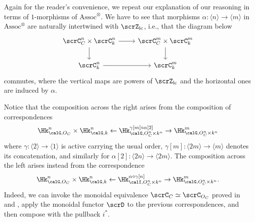 \documentclass[10pt, reqno]{amsart}
\theoremstyle{plain}
\theoremstyle{definition}
\numberwithin{equation}{section}
\begin{document}
	Again for the reader's convenience, we repeat our explanation of our reasoning in terms of $1$-morphisms of $\mathrm{Assoc}^\otimes$. We have to see that morphisms $\alpha\colon \langle n \rangle \to \langle m \rangle$ in $\mathrm{Assoc}^\otimes$ are naturally intertwined with $\scrZ_{\mathrm{lc}}$, i.e., that the diagram below
	\begin{equation}\begin{tikzcd}
			\scrC_C^n\times \scrC_k^n& \scrC_C^m\times \scrC_k^m\\
			\scrC_k^n & \scrC_k^m
			\arrow[from=1-2, to=2-2]
			\arrow[from=1-1, to=2-1]
			\arrow[from=1-1, to=1-2]
			\arrow[from=2-1, to=2-2]
		\end{tikzcd}
	\end{equation} commutes, where the vertical maps are powers of $\scrZ_{\mathrm{lc}}$ and the horizontal ones are induced by $\alpha$.
	
	Notice that the composition across the right arises from the composition of correspondences
	\begin{equation}
		\Hk_{\calG,O_C}^n \times \Hk_{\calG,k}^n \leftarrow \Hk_{\calG,O_C^n \times k^n}^{\gamma[m]\circ\alpha[2]} \to \Hk_{\calG,O_C^n\times k^n}^m
	\end{equation}
	where $\gamma: \langle 2 \rangle \to \langle 1 \rangle$ is active carrying the usual order, $\gamma[m]\colon \langle 2m \rangle \to \langle m \rangle$ denotes its concatenation, and similarly for $\alpha[2]\colon \langle 2n \rangle \to \langle 2m \rangle$. The composition across the left arises instead from the correspondence
	\begin{equation}
		\Hk_{\calG,O_C}^n \times \Hk_{\calG,k}^n
		\leftarrow \Hk_{\calI, O_C^n \times k^n}^{\alpha\circ \gamma[n]} \to \Hk_{\calG, O_C^n \times k^n}^m.
	\end{equation}
	Indeed, we can invoke the monoidal equivalence $\scrC_{C} \simeq \scrC_{O_C}$ proved in  and \cite[Proposition 6.12]{AGLR22}, apply the monoidal functor $\scrD$ to the previous correspondences, and then compose with the pullback $i^*$. 
	
\end{document}
